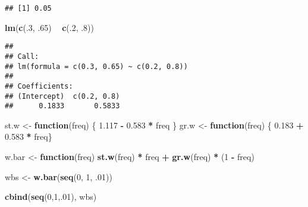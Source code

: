 \documentclass[]{article}
\newenvironment{Shaded}{\begin{snugshade}}{\end{snugshade}}
\newcommand{\KeywordTok}[1]{\textcolor[rgb]{0.13,0.29,0.53}{\textbf{#1}}}
\newcommand{\DecValTok}[1]{\textcolor[rgb]{0.00,0.00,0.81}{#1}}
\newcommand{\FloatTok}[1]{\textcolor[rgb]{0.00,0.00,0.81}{#1}}
\newcommand{\StringTok}[1]{\textcolor[rgb]{0.31,0.60,0.02}{#1}}
\newcommand{\ControlFlowTok}[1]{\textcolor[rgb]{0.13,0.29,0.53}{\textbf{#1}}}
\newcommand{\OperatorTok}[1]{\textcolor[rgb]{0.81,0.36,0.00}{\textbf{#1}}}
\newcommand{\NormalTok}[1]{#1}
\begin{document}
\begin{verbatim}
## [1] 0.05
\end{verbatim}

\begin{Shaded}
\begin{Highlighting}[]
\KeywordTok{lm}\NormalTok{(}\KeywordTok{c}\NormalTok{(.}\DecValTok{3}\NormalTok{, .}\DecValTok{65}\NormalTok{) }\OperatorTok{~}\StringTok{ }\KeywordTok{c}\NormalTok{(.}\DecValTok{2}\NormalTok{, .}\DecValTok{8}\NormalTok{))}
\end{Highlighting}
\end{Shaded}

\begin{verbatim}
## 
## Call:
## lm(formula = c(0.3, 0.65) ~ c(0.2, 0.8))
## 
## Coefficients:
## (Intercept)  c(0.2, 0.8)  
##      0.1833       0.5833
\end{verbatim}

\begin{Shaded}
\begin{Highlighting}[]
\NormalTok{st.w <-}\StringTok{ }\ControlFlowTok{function}\NormalTok{(freq) \{ }\FloatTok{1.117} \OperatorTok{-}\StringTok{ }\FloatTok{0.583} \OperatorTok{*}\StringTok{ }\NormalTok{freq \}}
\NormalTok{ gr.w <-}\StringTok{ }\ControlFlowTok{function}\NormalTok{(freq) \{ }\FloatTok{0.183} \OperatorTok{+}\StringTok{ }\FloatTok{0.583} \OperatorTok{*}\StringTok{ }\NormalTok{freq\}}

\NormalTok{ w.bar <-}\StringTok{ }\ControlFlowTok{function}\NormalTok{(freq) }\KeywordTok{st.w}\NormalTok{(freq) }\OperatorTok{*}\StringTok{ }\NormalTok{freq }\OperatorTok{+}\StringTok{ }\KeywordTok{gr.w}\NormalTok{(freq) }\OperatorTok{*}\StringTok{ }\NormalTok{(}\DecValTok{1} \OperatorTok{-}\StringTok{ }\NormalTok{freq)}

\NormalTok{ wbs <-}\StringTok{ }\KeywordTok{w.bar}\NormalTok{(}\KeywordTok{seq}\NormalTok{(}\DecValTok{0}\NormalTok{, }\DecValTok{1}\NormalTok{, .}\DecValTok{01}\NormalTok{))}

\KeywordTok{cbind}\NormalTok{(}\KeywordTok{seq}\NormalTok{(}\DecValTok{0}\NormalTok{,}\DecValTok{1}\NormalTok{,.}\DecValTok{01}\NormalTok{), wbs)}
\end{Highlighting}
\end{Shaded}
\end{document}
